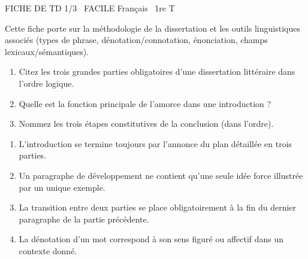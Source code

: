 \documentclass[11pt]{article}
\begin{document}
\begin{tcolorbox}[enhanced,colback=popink,colframe=popink,arc=10pt,boxrule=0pt,left=12pt,right=12pt,top=9pt,bottom=9pt]
{\color{white}\popxbold\small FICHE DE TD 1/3 \textbullet\ FACILE \hfill Français \textbullet\ 1re T\par}
\end{tcolorbox}
\vspace{4pt}
Cette fiche porte sur la méthodologie de la dissertation et les outils linguistiques associés (types de phrase, dénotation/connotation, énonciation, champs lexicaux/sémantiques).

\begin{exercice}
\begin{enumerate}
    \item Citez les trois grandes parties obligatoires d'une dissertation littéraire dans l'ordre logique.
    \item Quelle est la fonction principale de l'amorce dans une introduction ?
    \item Nommez les trois étapes constitutives de la conclusion (dans l'ordre).
\end{enumerate}
\end{exercice}

\begin{exercice}
\begin{enumerate}
    \item L'introduction se termine toujours par l'annonce du plan détaillée en trois parties.
    \item Un paragraphe de développement ne contient qu'une seule idée force illustrée par un unique exemple.
    \item La transition entre deux parties se place obligatoirement à la fin du dernier paragraphe de la partie précédente.
    \item La dénotation d'un mot correspond à son sens figuré ou affectif dans un contexte donné.
\end{enumerate}
\end{exercice}
\end{document}
